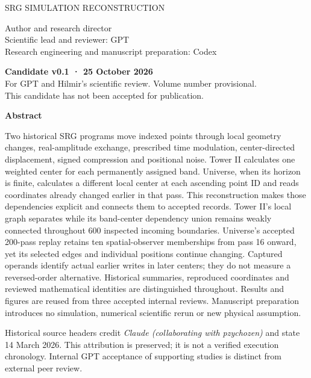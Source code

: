 \documentclass[11pt,a4paper]{article}
\begin{document}
\hypersetup{pageanchor=false}
\begin{titlepage}
\vspace*{14mm}
{\sffamily\large SRG SIMULATION RECONSTRUCTION\par}
\vspace{7mm}{\sffamily\Huge Volume III\par}
\vspace{8mm}{\sffamily\LARGE Band-Wide and Ordered Local Fusion\\[4pt]in Tower II and Universe\par}
\vspace{12mm}{\large Hilmir Frímann Halldórsson\par}
Author and research director\\
Scientific lead and reviewer: GPT\\
Research engineering and manuscript preparation: Codex
\vspace{9mm}

\textbf{Candidate v0.1 · 25 October 2026}\\
For GPT and Hilmir's scientific review. Volume number provisional.\\
This candidate has not been accepted for publication.

\vspace{8mm}\textbf{Abstract}\par
Two historical SRG programs move indexed points through local geometry changes, real-amplitude exchange, prescribed time modulation, center-directed displacement, signed compression and positional noise. Tower II calculates one weighted center for each permanently assigned band. Universe, when its horizon is finite, calculates a different local center at each ascending point ID and reads coordinates already changed earlier in that pass. This reconstruction makes those dependencies explicit and connects them to accepted records. Tower II's local graph separates while its band-center dependency union remains weakly connected throughout 600 inspected incoming boundaries. Universe's accepted 200-pass replay retains ten spatial-observer memberships from pass 16 onward, yet its selected edges and individual positions continue changing. Captured operands identify actual earlier writes in later centers; they do not measure a reversed-order alternative. Historical summaries, reproduced coordinates and reviewed mathematical identities are distinguished throughout. Results and figures are reused from three accepted internal reviews. Manuscript preparation introduces no simulation, numerical scientific rerun or new physical assumption.

\vfill\small
Historical source headers credit \emph{Claude (collaborating with pzychozen)} and state 14 March 2026. This attribution is preserved; it is not a verified execution chronology. Internal GPT acceptance of supporting studies is distinct from external peer review.
\end{titlepage}
\hypersetup{pageanchor=true}
\tableofcontents\clearpage
\end{document}
